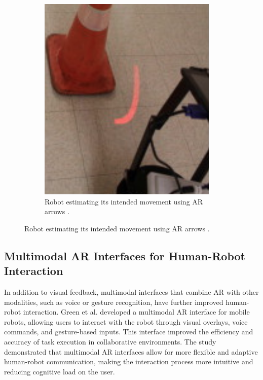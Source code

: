 \begin{figure}[ht]
\begin{subfigure}[b]{0.32\textwidth}
        \includegraphics[width=\textwidth]{ch2/figs/robot_nav_1.png}
        \caption{Robot estimating its intended movement using AR arrows \cite{Coovert2014}.}
        \label{fig:intended_path}
    \end{subfigure}
\end{figure}



\subsection{Multimodal AR Interfaces for Human-Robot Interaction}

In addition to visual feedback, multimodal interfaces that combine AR with other modalities, such as voice or gesture recognition, have further improved human-robot interaction. Green et al. \cite{Green2019} developed a multimodal AR interface for mobile robots, allowing users to interact with the robot through visual overlays, voice commands, and gesture-based inputs. This interface improved the efficiency and accuracy of task execution in collaborative environments. The study demonstrated that multimodal AR interfaces allow for more flexible and adaptive human-robot communication, making the interaction process more intuitive and reducing cognitive load on the user.

